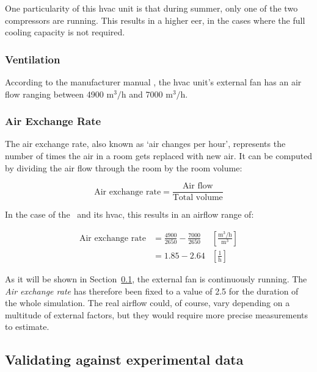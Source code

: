 One particularity of this \acrshort{hvac} unit is that during summer, only one
of the two compressors are running. This results in a higher \acrlong{eer}, in
the cases where the full cooling capacity is not required.

\subsubsection*{Ventilation}

According to the manufacturer manual \cite{aermecRoofTopManuelSelection}, the
\acrshort{hvac} unit's external fan has an air flow ranging between 4900
$\text{m}^3/\text{h}$ and 7000 $\text{m}^3/\text{h}$.

\subsubsection*{Air Exchange Rate}\label{sec:Air_Exchange_Rate}

The air exchange rate, also known as `air changes per hour', represents the
number of times the air in a room gets replaced with new air. It can be
computed by dividing the air flow through the room by the room volume:

\begin{equation}
    \text{Air exchange rate} = \frac{\text{Air flow}}{\text{Total volume}}
\end{equation}

In the case of the \pdome\ and its \acrshort{hvac}, this results in an airflow
range of:

\begin{equation}
    \begin{aligned}
        \text{Air exchange rate} &= \frac{4900}{2650} 
        - \frac{7000}{2650} &\left[\frac{\text{m}^3/\text{h}}{\text{m}^3}\right]\\
                            &= 1.85 - 2.64 &\left[\frac{1}{\text{h}}\right]
    \end{aligned}
\end{equation}

As it will be shown in Section~\ref{sec:CARNOT_experimental}, the external fan
is continuously running. The \textit{Air exchange rate} has therefore been fixed
to a value of 2.5 for the duration of the whole simulation. The real airflow
could, of course, vary depending on a multitude of external factors, but they
would require more precise measurements to estimate.

\subsection{Validating against experimental data}\label{sec:CARNOT_experimental}

